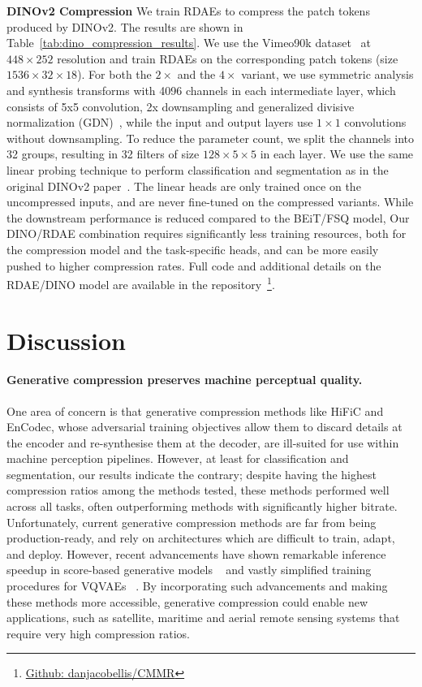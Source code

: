 \documentclass[10pt,twocolumn,letterpaper]{article}
\begin{document}
\textbf{DINOv2 Compression} We train RDAEs to compress the patch tokens produced by DINOv2. The results are shown in Table~\ref{tab:dino_compression_results}. We use the Vimeo90k dataset~\cite{xue2019video} at $448\times252$ resolution and train RDAEs on the corresponding patch tokens (size $1536\times32\times18$). For both the $2\times$ and the $4\times$ variant, we use symmetric analysis and synthesis transforms with 4096 channels in each intermediate layer, which consists of 5x5 convolution, 2x downsampling and generalized divisive normalization (GDN)~\cite{johnston2019computationally}, while the input and 
output layers use $1\times1$ convolutions without downsampling. To reduce the parameter count, we split the channels into 32 groups, resulting in 32 filters of size $128\times5\times5$ in each layer. We use the same linear probing technique to perform classification and segmentation as in the original DINOv2 paper~\cite{oquab2023dinov2}. The linear heads are only trained once on the uncompressed inputs, and are never fine-tuned on the compressed variants.  While the downstream performance is reduced compared to the BEiT/FSQ model, Our DINO/RDAE combination requires significantly less training resources, both for the compression model and the task-specific heads, and can be more easily pushed to higher compression rates. Full code and additional details on the RDAE/DINO model are available in the repository~\footnote{\href{https://github.com/danjacobellis/CMMR}{Github: danjacobellis/CMMR}}.

\section{Discussion}

\paragraph{Generative compression preserves machine perceptual quality.} One area of concern is that generative compression methods like HiFiC and EnCodec, whose adversarial training objectives allow them to discard details at the encoder and re-synthesise them at the decoder, are ill-suited for use within machine perception pipelines. However, at least for classification and segmentation, our results indicate the contrary; despite having the highest compression ratios among the methods tested, these methods performed well across all tasks, often outperforming methods with significantly higher bitrate. Unfortunately, current generative compression methods are far from being production-ready, and rely on architectures which are difficult to train, adapt, and deploy. However, recent advancements have shown remarkable inference speedup in score-based generative models ~\cite{song2023consistency} and vastly simplified training procedures for VQVAEs ~\cite{mentzer2023finite}. By incorporating such advancements and making these methods more accessible, generative compression could enable new applications, such as satellite, maritime and aerial remote sensing systems that require very high compression ratios.
\end{document}
